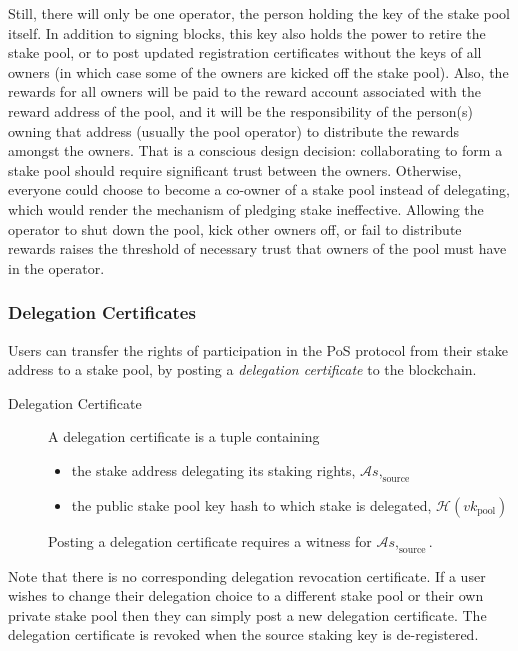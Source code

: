 \documentclass[11pt,a4paper]{article}
\begin{document}
Still, there will only be one operator, the person holding the key of the stake
pool itself. In addition to signing blocks, this key also holds the power to
retire the stake pool, or to post updated registration certificates without the
keys of all owners (in which case some of the owners are kicked off the stake
pool). Also, the rewards for all owners will be paid to the reward account
associated with the reward address of the pool, and it will be the
responsibility of the person(s) owning that address (usually the pool operator) to
distribute the rewards amongst the owners.
That is a conscious design decision: collaborating to form a stake pool should
require significant trust between the owners. Otherwise, everyone could choose
to become a co-owner of a stake pool instead of delegating, which would render
the mechanism of pledging stake ineffective. Allowing the operator to shut down
the pool, kick other owners off, or fail to distribute rewards raises the
threshold of necessary trust that owners of the pool must have in the operator.

\subsubsection{Delegation Certificates}
\label{delegation-certificates}

Users can transfer the rights of participation in the PoS protocol from
their stake address to a stake pool, by posting a \emph{delegation
certificate} to the blockchain.

\begin{description}
\item[Delegation Certificate]
A delegation certificate is a tuple containing

\begin{itemize}
\item
  the stake address delegating its staking rights,
  \(\mathcal{A}{s,_\text{source}}\)
\item
  the public stake pool key hash to which stake is delegated,
  \(\mathcal{H}(vk_\text{pool})\)
\end{itemize}

Posting a delegation certificate requires a witness for
\(\mathcal{A}{s,_\text{source}}\).
\end{description}

Note that there is no corresponding delegation revocation certificate.
If a user wishes to change their delegation choice to a different stake
pool or their own private stake pool then they can simply post a new
delegation certificate. The delegation certificate is revoked when the
source staking key is de-registered.
\end{document}
